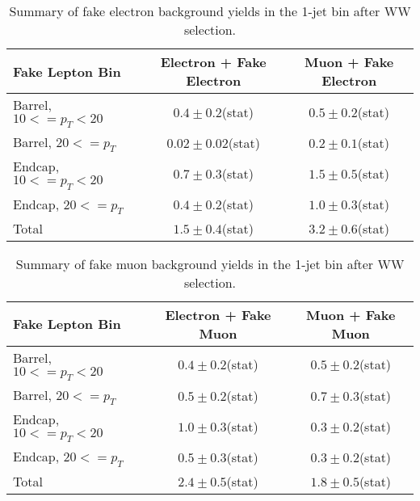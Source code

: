 \begin{table}[!htbp]
\begin{center}
\begin{tabular}{|l|c|c|}
\hline
Fake Lepton Bin               & Electron + Fake Electron & Muon + Fake Electron  \\
\hline
Barrel, $10 <= p_{T} < 20$    &  $0.4 \pm 0.2$(stat)     &   $0.5 \pm 0.2$(stat) \\
Barrel, $20 <= p_{T} $        &  $0.02 \pm 0.02$(stat)   &   $0.2 \pm 0.1$(stat) \\
Endcap, $10 <= p_{T} < 20$    &  $0.7 \pm 0.3$(stat)     &   $1.5 \pm 0.5$(stat) \\
Endcap, $20 <= p_{T} $        &  $0.4 \pm 0.2$(stat)     &   $1.0 \pm 0.3$(stat) \\
\hline
Total                         &  $1.5  \pm 0.4$(stat)    &   $3.2 \pm 0.6$(stat) \\
\hline
\end{tabular}
\caption{Summary of fake electron background yields in the 1-jet bin after WW selection. }
\label{tab:FakeElectronBkgPrediction_WWSelection_1JetBin}
\end{center}
\end{table}

\begin{table}[!htbp]
\begin{center}
\begin{tabular}{|l|c|c|}
\hline
Fake Lepton Bin               & Electron + Fake Muon & Muon + Fake Muon  \\
\hline
Barrel, $10 <= p_{T} < 20$    &  $0.4 \pm 0.2$(stat)     &   $0.5 \pm 0.2$(stat) \\
Barrel, $20 <= p_{T} $        &  $0.5 \pm 0.2$(stat)     &   $0.7 \pm 0.3$(stat) \\
Endcap, $10 <= p_{T} < 20$    &  $1.0 \pm 0.3$(stat)     &   $0.3 \pm 0.2$(stat) \\
Endcap, $20 <= p_{T} $        &  $0.5 \pm 0.3$(stat)     &   $0.3 \pm 0.2$(stat) \\
\hline
Total                         &  $2.4 \pm 0.5$(stat)     &   $1.8 \pm 0.5$(stat) \\
\hline
\end{tabular}
\caption{Summary of fake muon background yields in the 1-jet bin after WW selection. }
\label{tab:FakeElectronBkgPrediction_WWSelection_1JetBin}
\end{center}
\end{table}




